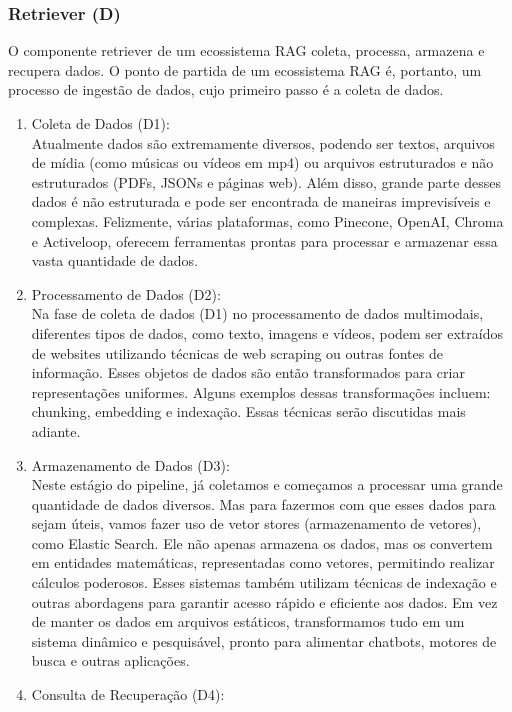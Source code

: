 \documentclass[a4paper, 12pt]{article}
\begin{document}
    \subsubsection{Retriever (D)}

    O componente retriever de um ecossistema RAG coleta, processa, armazena e recupera dados. O ponto de partida de um ecossistema RAG é, portanto, um processo de ingestão de dados, cujo primeiro passo é a coleta de dados.

    \begin{enumerate}
        \item Coleta de Dados (D1):\\
        Atualmente dados são extremamente diversos, podendo ser textos, arquivos de mídia (como músicas ou vídeos em mp4) ou arquivos estruturados e não estruturados (PDFs, JSONs e páginas web). Além disso, grande parte desses dados é não estruturada e pode ser encontrada de maneiras imprevisíveis e complexas. Felizmente, várias plataformas, como Pinecone, OpenAI, Chroma e Activeloop, oferecem ferramentas prontas para processar e armazenar essa vasta quantidade de dados.
        \item Processamento de Dados (D2):\\
        Na fase de coleta de dados (D1) no processamento de dados multimodais, diferentes tipos de dados, como texto, imagens e vídeos, podem ser extraídos de websites utilizando técnicas de web scraping ou outras fontes de informação. Esses objetos de dados são então transformados para criar representações uniformes. Alguns exemplos dessas transformações incluem: chunking, embedding e indexação. Essas técnicas serão discutidas mais adiante.
        \item Armazenamento de Dados (D3):\\
        Neste estágio do pipeline, já coletamos e começamos a processar uma grande quantidade de dados diversos. Mas para fazermos com que esses dados para sejam úteis, vamos fazer uso de vetor stores (armazenamento de vetores), como Elastic Search. Ele não apenas armazena os dados, mas os convertem em entidades matemáticas, representadas como vetores, permitindo realizar cálculos poderosos. Esses sistemas também utilizam técnicas de indexação e outras abordagens para garantir acesso rápido e eficiente aos dados. Em vez de manter os dados em arquivos estáticos, transformamos tudo em um sistema dinâmico e pesquisável, pronto para alimentar chatbots, motores de busca e outras aplicações.
        \item Consulta de Recuperação (D4):\\

\end{enumerate}
\end{document}
